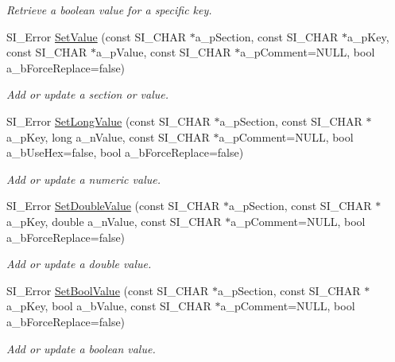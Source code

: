 \begin{DoxyCompactItemize}
\begin{DoxyCompactList}\small\item\em Retrieve a boolean value for a specific key. \end{DoxyCompactList}\item 
S\+I\+\_\+\+Error \hyperlink{class_c_simple_ini_templ_aa2014a3dc8fdd638316cf1d3611796ab}{Set\+Value} (const S\+I\+\_\+\+C\+H\+AR $\ast$a\+\_\+p\+Section, const S\+I\+\_\+\+C\+H\+AR $\ast$a\+\_\+p\+Key, const S\+I\+\_\+\+C\+H\+AR $\ast$a\+\_\+p\+Value, const S\+I\+\_\+\+C\+H\+AR $\ast$a\+\_\+p\+Comment=N\+U\+LL, bool a\+\_\+b\+Force\+Replace=false)
\begin{DoxyCompactList}\small\item\em Add or update a section or value. \end{DoxyCompactList}\item 
S\+I\+\_\+\+Error \hyperlink{class_c_simple_ini_templ_ab2238be407232e4bba0f1343e4793e4e}{Set\+Long\+Value} (const S\+I\+\_\+\+C\+H\+AR $\ast$a\+\_\+p\+Section, const S\+I\+\_\+\+C\+H\+AR $\ast$a\+\_\+p\+Key, long a\+\_\+n\+Value, const S\+I\+\_\+\+C\+H\+AR $\ast$a\+\_\+p\+Comment=N\+U\+LL, bool a\+\_\+b\+Use\+Hex=false, bool a\+\_\+b\+Force\+Replace=false)
\begin{DoxyCompactList}\small\item\em Add or update a numeric value. \end{DoxyCompactList}\item 
S\+I\+\_\+\+Error \hyperlink{class_c_simple_ini_templ_af92ba0b8067553ab693c62a370de6534}{Set\+Double\+Value} (const S\+I\+\_\+\+C\+H\+AR $\ast$a\+\_\+p\+Section, const S\+I\+\_\+\+C\+H\+AR $\ast$a\+\_\+p\+Key, double a\+\_\+n\+Value, const S\+I\+\_\+\+C\+H\+AR $\ast$a\+\_\+p\+Comment=N\+U\+LL, bool a\+\_\+b\+Force\+Replace=false)
\begin{DoxyCompactList}\small\item\em Add or update a double value. \end{DoxyCompactList}\item 
S\+I\+\_\+\+Error \hyperlink{class_c_simple_ini_templ_a48ae136fa20c5d7eb7ab0b75342b27cf}{Set\+Bool\+Value} (const S\+I\+\_\+\+C\+H\+AR $\ast$a\+\_\+p\+Section, const S\+I\+\_\+\+C\+H\+AR $\ast$a\+\_\+p\+Key, bool a\+\_\+b\+Value, const S\+I\+\_\+\+C\+H\+AR $\ast$a\+\_\+p\+Comment=N\+U\+LL, bool a\+\_\+b\+Force\+Replace=false)
\begin{DoxyCompactList}\small\item\em Add or update a boolean value. \end{DoxyCompactList}\item 

\end{DoxyCompactItemize}
